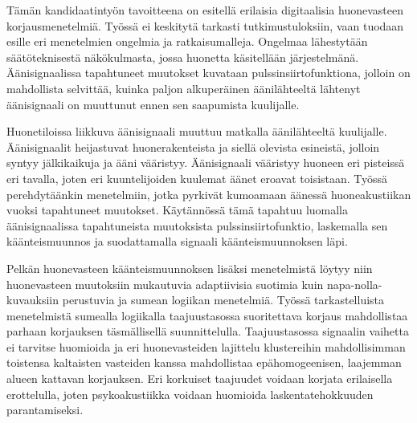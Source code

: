 \documentclass[finnish,12pt]{article}
\begin{document}


\makecoverpage

\begin{abstractpage}[finnish]

Tämän kandidaatintyön tavoitteena on esitellä erilaisia digitaalisia huonevasteen korjausmenetelmiä. Työssä ei keskitytä tarkasti tutkimustuloksiin, vaan tuodaan esille eri menetelmien ongelmia ja ratkaisumalleja. Ongelmaa lähestytään säätöteknisestä näkökulmasta, jossa huonetta käsitellään järjestelmänä. Äänisignaalissa tapahtuneet muutokset kuvataan pulssinsiirtofunktiona, jolloin on mahdollista selvittää, kuinka paljon alkuperäinen äänilähteeltä lähtenyt äänisignaali on muuttunut ennen sen saapumista kuulijalle. 
\newline

Huonetiloissa liikkuva äänisignaali muuttuu matkalla äänilähteeltä kuulijalle. Äänisignaalit heijastuvat huonerakenteista ja siellä olevista esineistä, jolloin syntyy jälkikaikuja ja ääni vääristyy. Äänisignaali vääristyy huoneen eri pisteissä eri tavalla, joten eri kuuntelijoiden kuulemat äänet eroavat toisistaan. Työssä perehdytäänkin menetelmiin, jotka pyrkivät kumoamaan äänessä huoneakustiikan vuoksi tapahtuneet muutokset. Käytännössä tämä tapahtuu luomalla äänisignaalissa tapahtuneista muutoksista pulssinsiirtofunktio, laskemalla sen käänteismuunnos ja suodattamalla signaali käänteismuunnoksen läpi.
\newline

Pelkän huonevasteen käänteismuunnoksen lisäksi menetelmistä löytyy niin huonevasteen muutoksiin mukautuvia adaptiivisia suotimia kuin napa-nolla-kuvauksiin perustuvia ja sumean logiikan menetelmiä. Työssä tarkastelluista menetelmistä sumealla logiikalla taajuustasossa suoritettava korjaus mahdollistaa parhaan korjauksen täsmällisellä suunnittelulla. Taajuustasossa signaalin vaihetta ei tarvitse huomioida ja eri huonevasteiden lajittelu klustereihin mahdollisimman toistensa kaltaisten vasteiden kanssa mahdollistaa epähomogeenisen, laajemman alueen kattavan korjauksen. Eri korkuiset taajuudet voidaan korjata erilaisella erottelulla, joten psykoakustiikka voidaan huomioida laskentatehokkuuden parantamiseksi.

\end{abstractpage}
\end{document}
